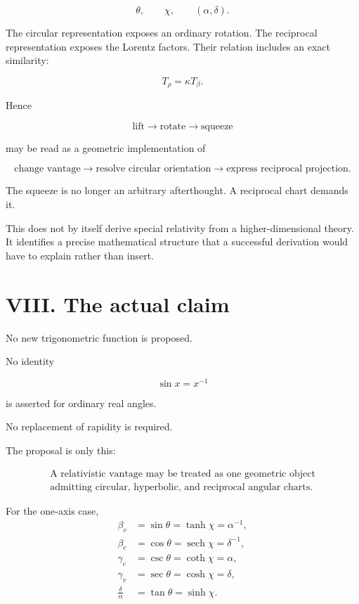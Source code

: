 \documentclass[9pt,twocolumn]{article}
\begin{document}
$$
\theta,\qquad
\chi,\qquad
(\alpha,\delta).
$$

The circular representation exposes an ordinary rotation. The reciprocal representation exposes the Lorentz factors. Their relation includes an exact similarity:

$$
T_\rho=\kappa T_\beta.
$$

Hence

\begin{equation}
\boxed{
\text{lift}\rightarrow
\text{rotate}\rightarrow
\text{squeeze}
}
\tag{35}
\end{equation}

may be read as a geometric implementation of

\begin{equation}
\boxed{
\text{change vantage}\rightarrow
\text{resolve circular orientation}\rightarrow
\text{express reciprocal projection}.
}
\tag{36}
\end{equation}

The squeeze is no longer an arbitrary afterthought. A reciprocal chart demands it.

This does not by itself derive special relativity from a higher-dimensional theory. It identifies a precise mathematical structure that a successful derivation would have to explain rather than insert.

\section*{VIII. The actual claim}

No new trigonometric function is proposed.

No identity

$$
\sin x=x^{-1}
$$

is asserted for ordinary real angles.

No replacement of rapidity is required.

The proposal is only this:

\begin{equation}
\boxed{
\begin{gathered}
\text{A relativistic vantage may be treated as one geometric object}\\
\text{admitting circular, hyperbolic, and reciprocal angular charts.}
\end{gathered}}
\tag{37}
\end{equation}

For the one-axis case,
\begin{equation}
\boxed{
\begin{aligned}
\beta_v
&=\sin\theta
=\tanh\chi
=\alpha^{-1},\\
\beta_c
&=\cos\theta
=\operatorname{sech}\chi
=\delta^{-1},\\
\gamma_c
&=\csc\theta
=\coth\chi
=\alpha,\\
\gamma_v
&=\sec\theta
=\cosh\chi
=\delta,\\
\frac{\delta}{\alpha}
&=\tan\theta
=\sinh\chi.
\end{aligned}}
\tag{38}
\end{equation}
\end{document}
